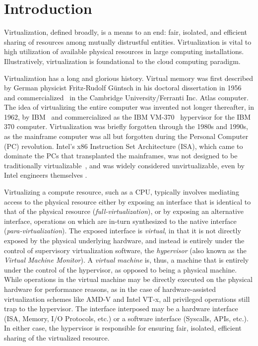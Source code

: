 \section{Introduction}
\label{sec:intro}

Virtualization, defined broadly, is a means to an end: fair, isolated, and
efficient sharing of resources among mutually distrustful entities.
Virtualization is vital to high utilization of available physical resources in
large computing installations. Illustratively, virtualization is foundational
to the cloud computing paradigm.

Virtualization has a long and glorious history. Virtual memory was first
described by German physicist Fritz-Rudolf Güntsch in his doctoral
dissertation in 1956~\cite{virtual-memory} and commercialized~\cite{atlas-vm}
in the Cambridge University/Ferranti Inc. Atlas computer. The idea of
virtualizing the entire computer was invented not longer thereafter, in 1962,
by IBM~\cite{cp40} and commercialized as the IBM VM-370~\cite{vm370} hypervisor
for the IBM 370 computer. Virtualization was briefly forgotten through the
1980s and 1990s, as the mainframe computer was all but forgotten during the
Personal Computer (PC) revolution. Intel's x86 Instruction Set Architecture
(ISA), which came to dominate the PCs that transplanted the mainframes, was not
designed to be traditionally virtualizable~\cite{popek-goldberg}, and was
widely considered unvirtualizable, even by Intel engineers themselves
.

Virtualizing a compute resource, such as a CPU, typically involves mediating
access to the physical resource either by exposing an interface that is
identical to that of the physical resource (\emph{full-virtualization}), or by
exposing an alternative interface, operations on which are in-turn synthesized
to the native interface (\emph{para-virtualization}).
The exposed interface is \emph{virtual}, in that it is not directly exposed by
the physical underlying hardware, and instead is entirely under the control of
supervisory virtualization software, the \emph{hypervisor} (also known as the
\emph{Virtual Machine Monitor}). A \emph{virtual machine} is, thus, a machine
that is entirely under the control of the hypervisor, as opposed to being a
physical machine. While operations in the virtual machine may be directly
executed on the physical hardware for performance reasons, as in the case of
hardware-assisted virtualization schemes like AMD-V and Intel VT-x, all
privileged operations still trap to the hypervisor.
The interface interposed may be a hardware interface (ISA, Memory, I/O
Protocols, etc.) or a software interface (Syscalls, APIs, etc.).
In either case, the hypervisor is responsible for ensuring fair, isolated,
efficient sharing of the virtualized resource.


